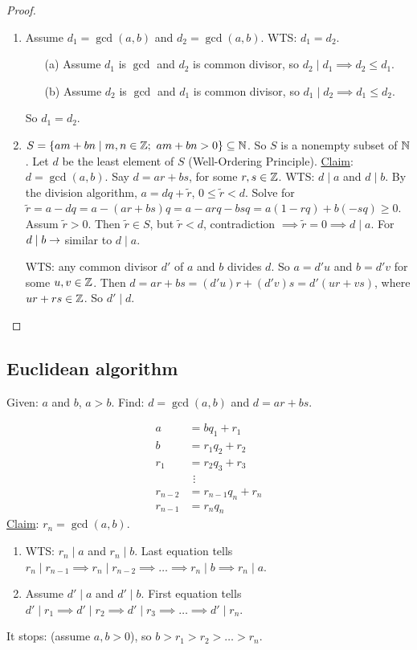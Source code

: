 \documentclass[]{article}
\begin{document}
\begin{proof}
	\begin{enumerate}
		\item Assume $d_1 = \gcd(a,b)$ and $d_2 = \gcd(a,b)$. WTS: $d_1 = d_2$.
		\begin{enumerate}
			\item[(a)] Assume $d_1$ is $\gcd$ and $d_2$ is common divisor, so $d_2\mid d_1 \implies d_2 \leq d_1$.
			\item[(b)] Assume $d_2$ is $\gcd$ and $d_1$ is common divisor, so $d_1\mid d_2 \implies d_1 \leq d_2$.
		\end{enumerate}
		So $d_1 = d_2$.
		
		\item $S = \{ am + bn \mid m,n\in\mb Z;\ am+bn>0\}\subseteq \mb N$. So $S$ is a nonempty subset of $\mathbb{N}$. Let $d$ be the least element of $S$ (Well-Ordering Principle). \ul{Claim}: $d = \gcd(a,b)$. Say $d = ar+bs$, for some $r,s\in\mathbb{Z}$. WTS: $d\mid a$ and $d\mid b$. By the division algorithm, $a = dq + \tilde{r}$, $0\leq \tilde{r}<d$. Solve for $\tilde{r} = a-dq = a-(ar+bs)q = a - arq - bsq = a(1-rq)+b(-sq) \geq 0$. Assum $\tilde r >0$. Then $\tilde r \in S$, but $\tilde r<d$, contradiction $\implies \tilde r = 0 \implies d\mid a$. For $d\mid b \rightarrow$ similar to $d\mid a$.
		
		WTS: any common divisor $d'$ of $a$ and $b$ divides $d$. So $a = d' u$ and $b = d' v$ for some $u,v\in\mathbb{Z}$. Then $d = ar+bs = (d'u)r + (d'v)s = d'(ur + vs)$, where $ur+rs\in\mathbb{Z}$. So $d'\mid d$.
	\end{enumerate}
\end{proof}

\subsection{Euclidean algorithm}
Given: $a$ and $b$, $a>b$.
Find: $d = \gcd(a,b)$ and $d = ar+bs$.

\begin{align*}
	a &= bq_1 + r_1 \\
	b &= r_1q_2 + r_2 \\
	r_1 &= r_2q_3 + r_3 \\
	&\ \,\vdots \\
	r_{n-2} &= r_{n-1}q_n + r_n \\
	r_{n-1} &= r_n q_n
\end{align*}
\ul{Claim}: $r_n = \gcd(a,b)$.
\begin{enumerate}
	\item WTS: $r_n\mid a$ and $r_n\mid b$. Last equation tells $r_n\mid r_{n-1} \implies r_n\mid r_{n-2} \implies \dots \implies r_n\mid b \implies r_n\mid a$.
	\item Assume $d'\mid a$ and $d'\mid b$. First equation tells $d'\mid r_1 \implies d'\mid r_2 \implies d'\mid r_3 \implies \dots \implies d'\mid r_n$.
\end{enumerate}
It stops: (assume $a,b>0$), so $b>r_1 > r_2 > \dots > r_n$.
\end{document}
